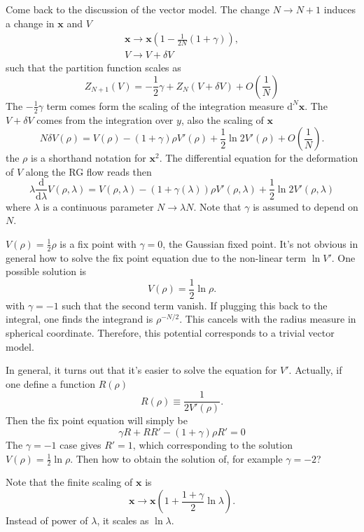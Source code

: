 Come back to the discussion of the vector model.
The change $N\to N+1 $ induces a change in $\mathbf{x}$ and $V$
\begin{align}
	\mathbf{x} \to \mathbf{x} \left(1- \frac{1}{2N}(1+\gamma)\right),\\
	V \to V + \delta V
\end{align}
such that the partition function scales as
\begin{equation}
	Z_{N+1}(V) = -\frac{1}{2} \gamma + Z_N(V+\delta V) + O(\frac{1}{N})
\end{equation}
The $-\frac{1}{2}\gamma$ term comes form the scaling of the integration measure $\mathrm{d}^N \mathbf{x}$.
The $V+\delta V$ comes from the integration over $y$, also the scaling of $\mathbf{x}$
\[
N \delta V (\rho) = V(\rho) - (1+\gamma) \rho V'(\rho) + \frac{1}{2} \ln 2 V'(\rho) + O(\frac{1}{N})
.\] 
the $\rho$ is a shorthand notation for $\mathbf{x}^2$.
The differential equation for the deformation of $V$ along the RG flow reads then
\begin{equation}
	\lambda \frac{\mathrm{d}}{\mathrm{d} \lambda} V(\rho,\lambda) = V(\rho,\lambda) - \left(1+\gamma(\lambda)\right) \rho V'(\rho,\lambda) + \frac{1}{2} \ln 2V'(\rho,\lambda)
\end{equation}
where $\lambda$ is a continuous parameter $N\to \lambda N$.
Note that $\gamma$ is assumed to depend on $N$.


$V(\rho) = \frac{1}{2} \rho$ is a fix point with $\gamma=0$, the Gaussian fixed point.
It's not obvious in general how to solve the fix point equation due to the non-linear term $\ln V'$.
One possible solution is
\[
V(\rho) = \frac{1}{2} \ln \rho
.\] 
with $\gamma=-1$ such that the second term vanish.
If plugging this back to the integral, one finds the integrand is $\rho^{- N / 2}$.
This cancels with the radius measure in spherical coordinate.
Therefore, this potential corresponds to a trivial vector model.

In general, it turns out that it's easier to solve the equation for $V'$.
Actually, if one define a function $R(\rho)$
\[
R(\rho) \equiv \frac{1}{2 V'(\rho)}
.\] 
Then the fix point equation will simply be
\begin{equation}
	\gamma R + R R' - (1 + \gamma) \rho R' = 0
\end{equation}
The $\gamma = -1$ case gives $R'=1$, which corresponding to the solution $V(\rho)=\frac{1}{2}\ln\rho$.
Then how to obtain the solution of, for example $\gamma=-2$?

Note that the finite scaling of $\mathbf{x}$ is
\[
\mathbf{x} \to \mathbf{x} \left(1 + \frac{1 + \gamma}{2} \ln \lambda\right)
.\] 
Instead of power of $\lambda$, it scales as $\ln \lambda$.

